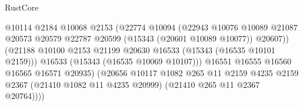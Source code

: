 \begin{lexlean}{RustCore}
\begin{coremodule}
                                                    @10114
                                                    @2184
                                                    @10068
                                                    @2153
                                                    (@22774
                                                      @10094
                                                      (@22943
                                                        @10076
                                                        @10089
                                                        @21087
                                                        @20573
                                                        @20579
                                                        @22787
                                                        @20599
                                                        (@15343 (@20601 @10089 @10077))
                                                        @20607))
                                                    (@21188
                                                      @10100
                                                      @2153
                                                      @21199
                                                      @20630
                                                      @16533
                                                      (@15343 (@16535 @10101 @2159)))
                                                    @16533
                                                    (@15343 (@16535 @10069 @10107)))
                                                  @16551
                                                  @16555
                                                  @16560
                                                  @16565
                                                  @16571
                                                  @20935)
                                                (@20656
                                                  @10117
                                                  @1082
                                                  @265
                                                  @11
                                                  @2159
                                                  @4235
                                                  @2159
                                                  @2367
                                                  (@21410 @1082 @11 @4235 @20999)
                                                  (@21410 @265 @11 @2367 @20764))))

\end{coremodule}
\end{lexlean}
